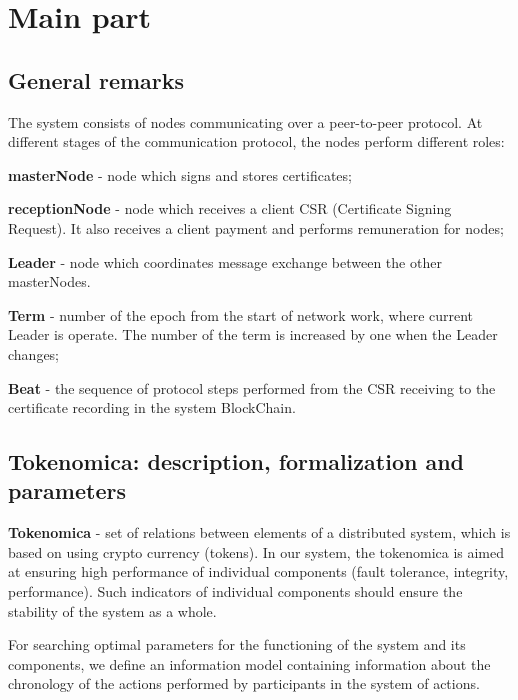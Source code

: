 \documentclass[12pt, a5paper]{article}
\begin{document}
\section{Main part}
\subsection{General remarks}

The system consists of nodes communicating over a peer-to-peer protocol. At different stages of the communication protocol, the nodes perform different roles:

\textbf{masterNode} -  node which signs and stores certificates;

\textbf{receptionNode} - node which receives a client CSR (Certificate Signing Request). It also  receives a client payment and performs remuneration for nodes;

\textbf{Leader} -  node which coordinates message exchange between the other masterNodes.

\textbf{Term} -  number of the epoch from the start of network work, where current Leader is operate. The number of the term is increased by one when the Leader changes;

\textbf{Beat} -  the sequence of protocol steps performed from the CSR receiving to the certificate recording in the system BlockChain. 
\subsection{Tokenomica: description, formalization and parameters}

\textbf{Tokenomica} -  set of relations between elements of a distributed system, which is based on using crypto currency (tokens). In our system, the tokenomica is aimed at ensuring high performance of individual components (fault tolerance, integrity, performance). Such indicators of individual components should ensure the stability of the system as a whole.

For searching optimal parameters for the functioning of the system and its components, we define an information model containing information about the chronology of the actions performed by participants in the system of actions.
\end{document}
